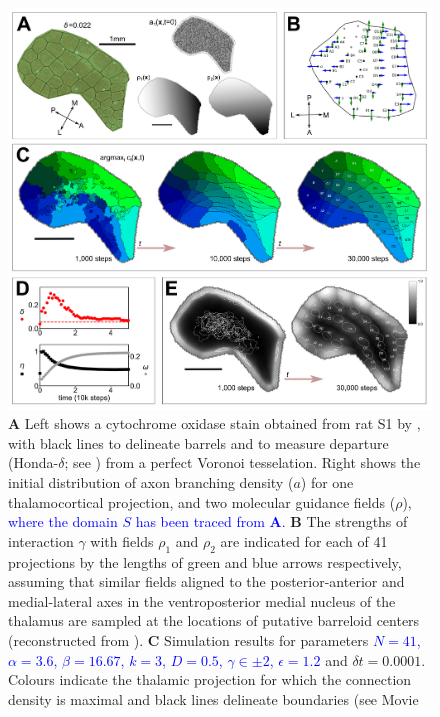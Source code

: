 \documentclass[9pt,lineno]{elife}
\newcommand{\cmnt}[1]{\textcolor{blue}{#1}}
\begin{document}
\begin{figure}
  \begin{fullwidth}
    \includegraphics[width=\linewidth]{./Fig1.png}
    \caption{\textbf{A} Left shows a cytochrome oxidase stain obtained from rat S1
      by \cite{zheng_signal_2001}, with black lines to delineate barrels and to
      measure departure (Honda-$\delta$; see \citealp{senft_mouse_1991}) from a
      perfect Voronoi tesselation. Right shows the initial distribution of axon
      branching density ($a$) for one thalamocortical projection, and two
      molecular guidance fields ($\rho$), \cmnt{where the domain $S$ has been
        traced from \textbf{A}}. \textbf{B} The strengths of interaction
      $\gamma$ with fields $\rho_1$ and $\rho_2$ are indicated for each of 41
      projections by the lengths of green and blue arrows respectively, assuming
      that similar fields aligned to the posterior-anterior and medial-lateral
      axes in the ventroposterior medial nucleus of the thalamus are sampled at
      the locations of putative barreloid centers (reconstructed from
      \citealp{haidarliu_size_2001}). \textbf{C} Simulation results for parameters
      \cmnt{$N=41$, $\alpha=3.6$, $\beta=16.67$, $k=3$, $D=0.5$, $\gamma\in\pm 2$,
      $\epsilon=1.2$} and $\delta{t}=0.0001$. Colours indicate the thalamic
      projection for which the connection density is maximal and black lines
      delineate boundaries (see Movie
}
\end{fullwidth}
\end{figure}
\end{document}
